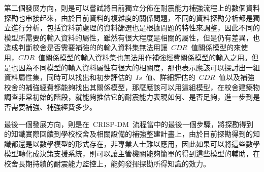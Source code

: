 

第二個發展方向，則是可以嘗試將目前獨立分佈在耐震能力補強流程上的數個資料探勘也串接起來，由於目前資料的複雜度的關係問題，不同的資料探勘分析都是獨立進行分析，包括資料前處理的資料篩選也是根據問題的特性來調整，因此不同的模型所需要的輸入資料的屬性，雖然有很大程度是相關的屬性，但是仍有差異，也造成判斷校舍是否需要補強的的輸入資料集無法用讓~$CDR$~值關係模型的來使用，$CDR$~值關係模型的輸入資料集也無法用作補強經費關係模型的輸入之用。但是也因為不同模型的輸入資料屬性有很大的相關度，那也表示應該可以探討出一組資料屬性集，同時可以找出和初步評估的~$Is$~值、詳細評估的~$CDR$~值以及補強校舍的補強經費都能夠找出其關係模型，那麼應該可以用這組模型，在校舍建築物調查非常初始的階段，就能夠推估它的耐震能力表現如何、是否足夠，進一步到是否需要補強、補強經費多少。

最後一個發展方向，則是在~CRISP-DM~流程當中的最後一個步驟，將探勘得到的知識實際回饋到學校校舍及相關設備的補強整建計畫上，由於目前探勘得到的知識都還是以數學模型的形式存在，非專業人士難以應用，因此如果可以將這些數學模型轉化成決策支援系統，則可以讓主管機關能夠簡單的得到這些模型的輔助，在校舍長期持續的耐震能力監控上，能夠發揮探勘所得知識的效力。






